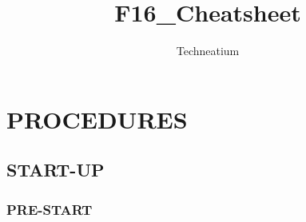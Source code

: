 \documentclass[fontInter]{TechCheck}
\title{F16_Cheatsheet}
\author{Techneatium}
\begin{document}
	

	\pagestyle{empty}
	\dominitoc
	\tableofcontents
	\cleardoublepage

	\setcounter{page}{1}
	\pagestyle{body}

	\chapter{PROCEDURES}
	\minitoc
	\cleardoublepage

	\section{START-UP}

	\subsection{PRE-START}
\end{document}
